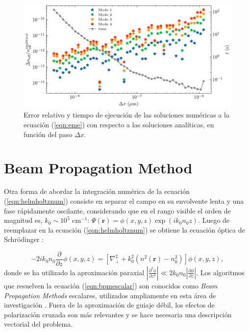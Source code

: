 \begin{figure}[H]
	\centering
	\includegraphics[width=\linewidth]{media/numerical_slab}
	\caption[Error relativo y tiempo de ejecución.]{Error relativo y tiempo de ejecución de las soluciones numéricas a la ecuación (\ref{eqn:eme}) con respecto a las soluciones analíticas, en función del paso $\Delta x$. \label{fig:emenumerror}}
\end{figure}
\section{Beam Propagation Method} 

Otra forma de abordar la integración numérica de la ecuación (\ref{eqn:helmholtznum}) consiste en separar el campo en su envolvente lenta y una fase rápidamente oscilante, considerando que en el rango visible el orden de magnitud es, $k_0 \sim 10 ^{5} \text{ cm}^{-1}$: $\Psi(\textbf{r}) = \phi(x,y,z)\exp(ik_0 n_0 z)$. Luego de reemplazar en la ecuación (\ref{eqn:helmholtznum}) se obtiene la ecuación óptica de Schrödinger \citep{paraxialschrodinger}:

\begin{equation}
	-2ik_0 n_0\frac{\partial }{\partial z}\phi(x,y, z) =  \left[\nabla_\perp^2 + k_0^2 (n^2(\textbf{r})-n_0^2)\right]\phi(x,y, z), \label{eqn:bpmescalar}
\end{equation} 
donde se ha utilizado la aproximación paraxial $\left| \frac{\partial^2 \phi}{\partial z^2} \right| \ll 2 k_0 n_0\left| \frac{\partial \phi}{\partial z} \right|$. Los algoritmos que resuelven la ecuación (\ref{eqn:bpmescalar}) son conocidos como \textit{Beam Propagation Methods} escalares, utilizados ampliamente en esta área de investigación \cite{bics, interorbital, OAMCaging, vortex, bpm}. Fuera de la aproximación de guiaje débil, los efectos de polarización cruzada son más relevantes y se hace necesaria una descripción vectorial del problema.

